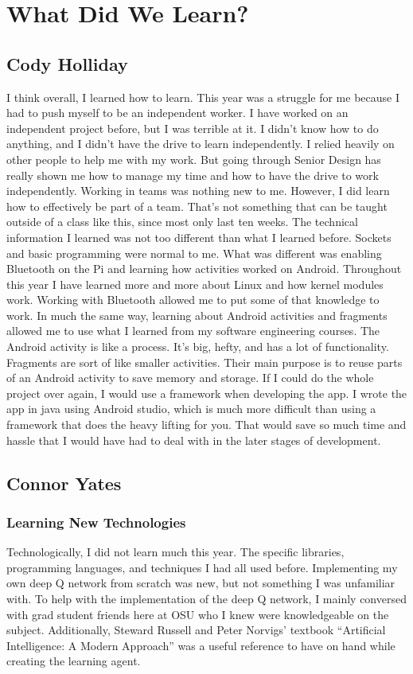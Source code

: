 \section{What Did We Learn?}
\subsection{Cody Holliday}
I think overall, I learned how to learn. This year was a struggle for me because I had to push myself to be an independent worker.
I have worked on an independent project before, but I was terrible at it.
I didn't know how to do anything, and I didn't have the drive to learn independently. 
I relied heavily on other people to help me with my work.
But going through Senior Design has really shown me how to manage my time and how to have the drive to work independently.
Working in teams was nothing new to me. However, I did learn how to effectively be part of a team.
That's not something that can be taught outside of a class like this, since most only last ten weeks.
The technical information I learned was not too different than what I learned before.
Sockets and basic programming were normal to me. What was different was enabling Bluetooth on the Pi and learning how activities worked on Android.
Throughout this year I have learned more and more about Linux and how kernel modules work.
Working with Bluetooth allowed me to put some of that knowledge to work.
In much the same way, learning about Android activities and fragments allowed me to use what I learned from my software engineering courses.
The Android activity is like a process. It's big, hefty, and has a lot of functionality.
Fragments are sort of like smaller activities. Their main purpose is to reuse parts of an Android activity to save memory and storage.
If I could do the whole project over again, I would use a framework when developing the app.
I wrote the app in java using Android studio, which is much more difficult than using a framework that does the heavy lifting for you.
That would save so much time and hassle that I would have had to deal with in the later stages of development.

\subsection{Connor Yates}
\subsubsection{Learning New Technologies}
Technologically, I did not learn much this year. The specific libraries, programming languages, and techniques I had all used before. Implementing my own deep Q network from scratch was new, but not something I was unfamiliar with. To help with the implementation of the deep Q network, I mainly conversed with grad student friends here at OSU who I knew were knowledgeable on the subject. Additionally, Steward Russell and Peter Norvigs' textbook ``Artificial Intelligence: A Modern Approach'' was a useful reference to have on hand while creating the learning agent.
